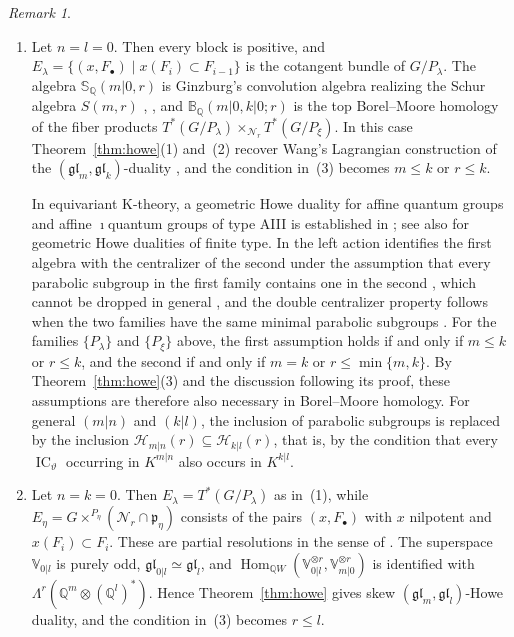 \documentclass[11pt,a4paper]{amsart}
\theoremstyle{definition}
\theoremstyle{remark}
\newtheorem{remark}[theorem]{Remark}
\newcommand{\Q}{\mathbb Q}
\newcommand{\N}{\mathcal N}
\newcommand{\bS}{\mathbb S}
\newcommand{\bB}{\mathbb B}
\newcommand{\IC}{\operatorname{IC}}
\newcommand{\Hom}{\operatorname{Hom}}
\numberwithin{equation}{section}
\begin{document}
\begin{remark}\label{rem:howe-special}
\begin{enumerate}
\item Let $n=l=0$. Then every block is positive, and
$E_\lambda=\{(x,F_\bullet)\mid x(F_i)\subset F_{i-1}\}$ is the cotangent
bundle of $G/P_\lambda$. The algebra $\bS_\Q(m|0,r)$ is Ginzburg's convolution
algebra realizing the Schur algebra $S(m,r)$ \cite{Gin91},
\cite[Chapter~4]{CG}, and $\bB_\Q(m|0,k|0;r)$ is the top Borel--Moore homology of
the fiber products $T^*(G/P_\lambda)\times_{\N_r}T^*(G/P_\xi)$. In this
case Theorem~\ref{thm:howe}(1) and~(2) recover Wang's Lagrangian
construction of the $(\mathfrak{gl}_m,\mathfrak{gl}_k)$-duality
\cite{Wan01}, and the condition in~(3) becomes $m\leq k$ or $r\leq k$.

In equivariant K-theory, a geometric Howe duality for affine quantum
groups and affine $\imath$quantum groups of type AIII is established in
\cite[Section~7.4]{LXY}; see also \cite{LX22} for geometric Howe
dualities of finite type. In \cite{LXY} the left action identifies the first
algebra with the centralizer of the second under the assumption that
every parabolic subgroup in the first family contains one in the second
\cite[Lemma~7.3]{LXY}, which cannot be dropped in general
\cite[Remark~7.4]{LXY}, and the double centralizer property follows when
the two families have the same minimal parabolic subgroups
\cite[Theorem~7.5]{LXY}. For the families $\{P_\lambda\}$ and $\{P_\xi\}$
above, the first assumption holds if and only if $m\leq k$ or $r\leq k$,
and the second if and only if $m=k$ or $r\leq\min\{m,k\}$. By
Theorem~\ref{thm:howe}(3) and the discussion following its proof, these
assumptions are therefore also necessary in Borel--Moore homology. For
general $(m|n)$ and $(k|l)$, the inclusion of parabolic subgroups is replaced by
the inclusion $\mathcal H_{m|n}(r)\subseteq\mathcal H_{k|l}(r)$, that is,
by the condition that every $\IC_\vartheta$ occurring in $K^{m|n}$ also
occurs in $K^{k|l}$.
\item Let $n=k=0$. Then $E_\lambda=T^*(G/P_\lambda)$ as in~(1), while
$E_\eta=G\times^{P_\eta}(\N_r\cap\mathfrak p_\eta)$ consists of the pairs
$(x,F_\bullet)$ with $x$ nilpotent and $x(F_i)\subset F_i$. These are
partial resolutions in the sense of \cite{BM}. The superspace
$\mathbb V_{0|l}$ is purely odd, $\mathfrak{gl}_{0|l}\simeq\mathfrak{gl}_l$,
and $\Hom_{\Q W}(\mathbb V_{0|l}^{\otimes r},\mathbb V_{m|0}^{\otimes r})$
is identified with $\Lambda^r(\Q^m\otimes(\Q^l)^*)$. Hence
Theorem~\ref{thm:howe} gives skew $(\mathfrak{gl}_m,\mathfrak{gl}_l)$-Howe
duality, and the condition in~(3) becomes $r\leq l$.
\end{enumerate}
\end{remark}
\end{document}

